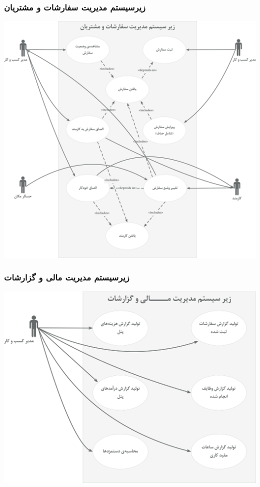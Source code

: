 \subsubsection{زیرسیستم مدیریت سفارشات و مشتریان}
\includegraphics[width = \textwidth]{images/order-customer-man}
\subsubsection{زیرسیستم مدیریت مالی و گزارشات}
\includegraphics[width = \textwidth]{images/financial-man}
